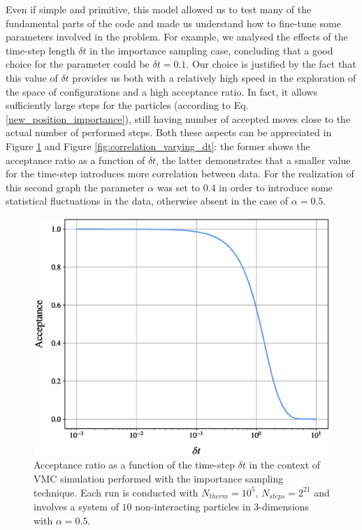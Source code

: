 Even if simple and primitive, this model allowed us to test many of the fundamental parts of the code and made us understand how to fine-tune some parameters involved in the problem. For example, we analysed the effects of the time-step length $\delta t$ in the importance sampling case, concluding that a good choice for the parameter could be $\delta t = 0.1$. Our choice is justified by the fact that this value of $\delta t$ provides us both with a relatively high speed in the exploration of the space of configurations and a high acceptance ratio. In fact, it allows sufficiently large steps for the particles (according to Eq.\,\ref{new_position_importance}), still having number of accepted moves close to the actual number of performed steps. Both these aspects can be appreciated in Figure \ref{fig:dt_importance_sampling} and Figure \ref{fig:correlation_varying_dt}: the former shows the acceptance ratio as a function of $\delta t$, the latter demonstrates that a smaller value for the time-step introduces more correlation between data. For the realization of this second graph the parameter $\alpha$ was set to 0.4 in order to introduce some statistical fluctuations in the data, otherwise absent in the case of $\alpha=0.5$.


\begin{figure}[H]
    \centering
    \includegraphics[scale=0.37]{images/varying_dt.eps}
    \caption{Acceptance ratio as a function of the time-step $\delta t$ in the context of VMC simulation performed with the importance sampling technique. Each run is conducted with $N_{therm}=10^5$, $N_{steps}=2^{21}$ and involves a system of $10$ non-interacting particles in 3-dimensions with $\alpha=0.5$.}
    \label{fig:dt_importance_sampling}
\end{figure}


